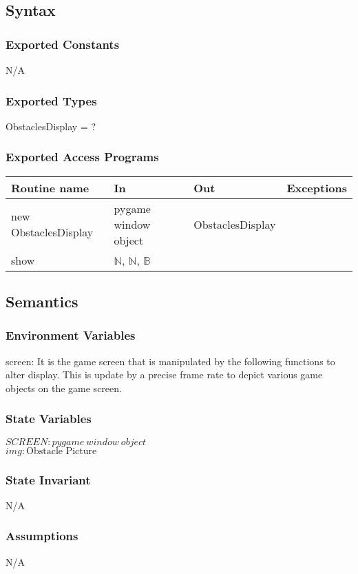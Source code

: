 \documentclass[12pt]{article}
\begin{document}
\subsection*{Syntax}
\subsubsection*{Exported Constants}
N/A
\subsubsection*{Exported Types}
ObstaclesDisplay = ?

\subsubsection*{Exported Access Programs}
\begin{tabular}{| l | l | l | l |}
\hline
\textbf{Routine name} & \textbf{In} & \textbf{Out} & \textbf{Exceptions}\\
\hline
new ObstaclesDisplay       &pygame window object&     ObstaclesDisplay        &           \\
\hline
show       &	$\mathbb{N}$, $\mathbb{N}$, $\mathbb{B}$     &           &          \\
\hline
\end{tabular}

\subsection*{Semantics}
\subsubsection*{Environment Variables}
screen: It is the game screen that is manipulated by the following functions to alter display. This is update by a precise frame rate to depict various game objects on the game screen.
\subsubsection*{State Variables}
$SCREEN: pygame\ window\ object$\\
$img: \text{Obstacle Picture}$
\subsubsection*{State Invariant}
N/A
\subsubsection*{Assumptions}
N/A
\end{document}
